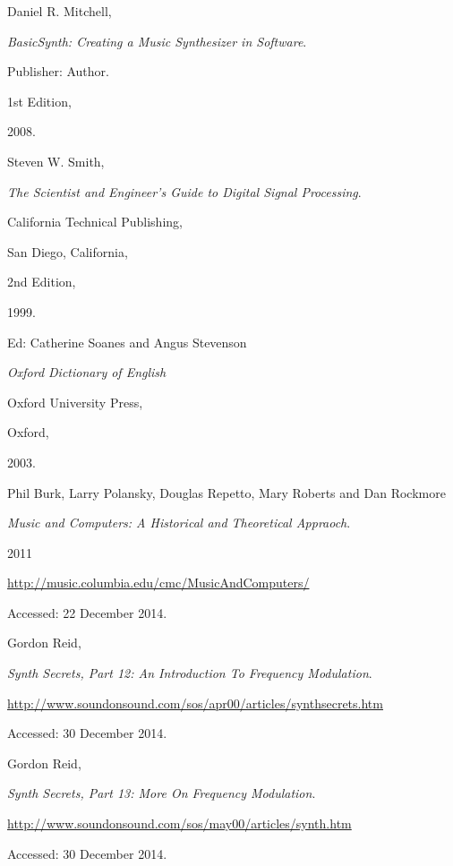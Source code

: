 \documentclass[12pt,twoside]{report}
\begin{document}
\begin{thebibliography}{9}


Daniel R. Mitchell,

\emph{BasicSynth: Creating a Music Synthesizer in Software}.

Publisher: Author.

1st Edition,

2008.


Steven W. Smith,

\emph{The Scientist and Engineer's Guide to Digital Signal Processing}.

California Technical Publishing,

San Diego, California,

2nd Edition,

1999.


Ed: Catherine Soanes and Angus Stevenson

\emph{Oxford Dictionary of English}

Oxford University Press,

Oxford,

2003.


Phil Burk, Larry Polansky, Douglas Repetto, Mary Roberts and Dan Rockmore

\emph{Music and Computers: A Historical and Theoretical Appraoch}.

2011

\url{http://music.columbia.edu/cmc/MusicAndComputers/}

Accessed: 22 December 2014.


Gordon Reid,

\emph{Synth Secrets, Part 12: An Introduction To Frequency Modulation}.

\url{http://www.soundonsound.com/sos/apr00/articles/synthsecrets.htm}

Accessed: 30 December 2014.


Gordon Reid,

\emph{Synth Secrets, Part 13: More On Frequency Modulation}.

\url{http://www.soundonsound.com/sos/may00/articles/synth.htm}

Accessed: 30 December 2014.


\end{thebibliography}
\end{document}
